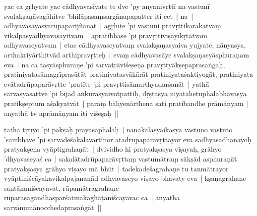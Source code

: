 \documentclass[article,12pt,a4paper]{memoir}%
\newcounter{parCount}
\begin{document}
	  \pstart \leavevmode%
	\label{thakur75-73.8}yac ca gṛhyate yac cādhyavasīyate te dve 'py anyanivṛttī na vastunī svalakṣaṇāvagāhitve 'bhilāpasaṃsargānupapatter iti cet | \label{thakur75-73.9} na | adhyavasāyasvarūpāparijñānāt | agṛhīte 'pi vastuni pravṛttikārakatvaṃ vikalpasyādhyavasāyitvam | apratibhāse 'pi pravṛttiviṣayīkṛtatvam adhyavaseyatvam | etac cādhyavaseyatvaṃ svalakṣaṇasyaiva yujyate, nānyasya, arthakriyārthitvād arthipravṛtteḥ | \label{thakur75-73.12} evaṃ cādhyavasāye svalakṣaṇasyāsphuraṇam eva | na ca tasyāsphuraṇe 'pi sarvatrāviśeṣeṇa pravṛttyākṣepaprasaṅgaḥ, pratiniyatasāmagrīprasūtāt pratiniyatasvākārāt pratiniyataśaktiyogāt, pratiniyata evātadrūpaparāvṛtte 'pratīte 'pi pravṛttisāmarthyadarśanāt | yathā sarvasyāsattve 'pi bījād aṅkurasyaivotpattiḥ, dṛṣṭasya niyatahetuphalabhāvasya pratikṣeptum aśakyatvāt | paraṃ bāhyenārthena sati pratibandhe prāmāṇyam | anyathā tv aprāmāṇyam iti viśeṣaḥ ||
	{}
	\pend%
      

	  \pstart \leavevmode%
	\label{thakur75-73.18}tathā tṛtīyo 'pi pakṣaḥ prayāsaphalaḥ | nānākālasyaikasya vastuno vastuto 'sambhave 'pi sarvadeśakālavartinor atadrūpaparāvṛttayor eva sādhyasādhanayoḥ pratyakṣeṇa vyāptigrahaṇāt |\label{thakur75-73.20} dvividho hi pratyakṣasya viṣayaḥ, grāhyo 'dhyavaseyaś ca | \label{ratnakīrtinibandhāvali__36r1OKKLAM78U8UT7RZ1GZQXEDK}sakalātadrūpaparāvṛttaṃ vastumātraṃ\label{ratnakīrtinibandhāvali__36r1OKKLAOUYW8OHNORUBKXVNLH} sākṣād asphuraṇāt pratyakṣasya grāhyo viṣayo mā bhūt | tadekadeśagrahaṇe tu tanmātrayor vyāptiniścāyakavikalpajananād adhyavaseyo viṣayo bhavaty eva | kṣaṇagrahaṇe santānaniścayavat, rūpamātragrahaṇe rūparasagandhasparśātmakaghaṭaniścayavac ca | anyathā sarvānumānocchedaprasaṅgāt ||
	{}
	\pend%
      
\end{document}
